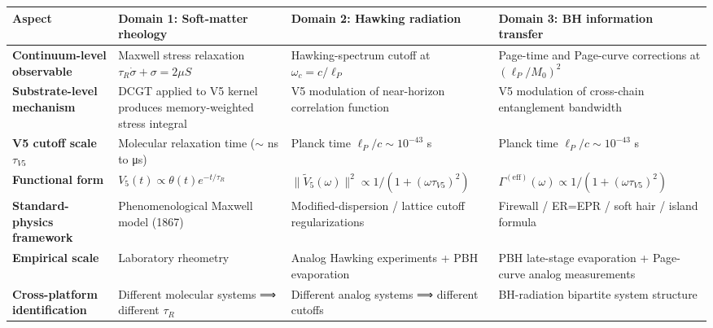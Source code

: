 \documentclass[
  11pt,
  a4paperpaper,
]{article}
\newcounter{none} %
\begin{document}
{\def\LTcaptype{none} %
\begin{longtable}[]{@{}
  >{\raggedright\arraybackslash}p{}
  >{\raggedright\arraybackslash}p{}
  >{\raggedright\arraybackslash}p{}
  >{\raggedright\arraybackslash}p{}@{}}
\toprule\noalign{}
\begin{minipage}[b]{\linewidth}\raggedright
Aspect
\end{minipage} & \begin{minipage}[b]{\linewidth}\raggedright
Domain 1: Soft-matter rheology
\end{minipage} & \begin{minipage}[b]{\linewidth}\raggedright
Domain 2: Hawking radiation
\end{minipage} & \begin{minipage}[b]{\linewidth}\raggedright
Domain 3: BH information transfer
\end{minipage} \\
\midrule\noalign{}
\endhead
\bottomrule\noalign{}
\endlastfoot
\textbf{Continuum-level observable} & Maxwell stress relaxation
\(\tau_R \dot\sigma + \sigma = 2\mu S\) & Hawking-spectrum cutoff at
\(\omega_c = c/\ell_P\) & Page-time and Page-curve corrections at
\((\ell_P/M_0)^2\) \\
\textbf{Substrate-level mechanism} & DCGT applied to V5 kernel produces
memory-weighted stress integral & V5 modulation of near-horizon
correlation function & V5 modulation of cross-chain entanglement
bandwidth \\
\textbf{V5 cutoff scale \(\tau_{V5}\)} & Molecular relaxation time
(\(\sim\) ns to μs) & Planck time \(\ell_P/c \sim 10^{-43}\) s & Planck
time \(\ell_P/c \sim 10^{-43}\) s \\
\textbf{Functional form} & \(V_5(t) \propto \theta(t) e^{-t/\tau_R}\) &
\(\|\tilde V_5(\omega)\|^2 \propto 1/(1+(\omega\tau_{V5})^2)\) &
\(\Gamma^{(\mathrm{eff})}(\omega) \propto 1/(1+(\omega\tau_{V5})^2)\) \\
\textbf{Standard-physics framework} & Phenomenological Maxwell model
(1867) & Modified-dispersion / lattice cutoff regularizations & Firewall
/ ER=EPR / soft hair / island formula \\
\textbf{Empirical scale} & Laboratory rheometry & Analog Hawking
experiments + PBH evaporation & PBH late-stage evaporation + Page-curve
analog measurements \\
\textbf{Cross-platform identification} & Different molecular systems ⟹
different \(\tau_R\) & Different analog systems ⟹ different cutoffs &
BH-radiation bipartite system structure \\
\end{longtable}
}
\end{document}
